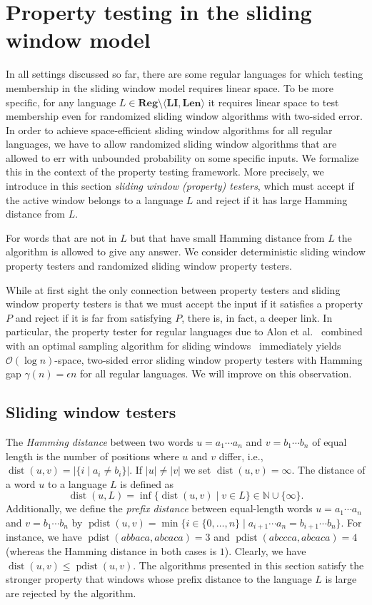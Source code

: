 \documentclass{theoretics}
\newcommand{\N}{\mathbb{N}}
\renewcommand{\O}{\mathcal{O}}
\DeclareMathOperator{\dist}{dist}
\DeclareMathOperator{\pdist}{pdist}
\newcommand{\Reg}{\mathbf{Reg}}
\newcommand{\Len}{\mathbf{Len}}
\newcommand{\LI}{\mathbf{LI}}
\renewcommand{\leq}{\leqslant}
\renewcommand{\le}{\leq}
\begin{document}
\section{Property testing in the sliding window model} \label{sec-SW-testing}

\label{chp:pt}
In all settings discussed so far, there are some regular languages for which testing membership in the sliding window model requires linear space.
To be more specific, for any language $L\in\Reg\setminus\langle \LI, \Len \rangle$ it requires linear space to test membership even for randomized sliding window algorithms with two-sided error.
In order to achieve space-efficient sliding window algorithms for all regular languages, we have
to allow randomized sliding window algorithms that are allowed to err with
unbounded probability on some specific inputs.
We formalize this in the context of the property testing framework. More precisely,
we introduce in this section {\em sliding window (property) testers},
which must accept if the active window belongs to a language $L$
and reject if it has large Hamming distance from $L$.

 For words that are not in $L$ but that have
small Hamming distance from $L$ the algorithm is allowed to give any answer.
We consider deterministic sliding window property testers
and randomized sliding window property testers.

While at first sight the only connection between property testers and sliding window property testers is that we must accept the input if it satisfies a property $P$ and reject if it is far from satisfying $P$, there is, in fact, a deeper link.
In particular, the property tester for regular languages due to Alon et al.~\cite{AlonKNS00}
combined with an optimal sampling algorithm for sliding windows~\cite{BravermanOZ12} immediately yields $\O(\log n)$-space, two-sided error sliding window property testers with Hamming gap $\gamma(n) = \epsilon n$ for all regular languages. We will improve on this observation. 

\subsection{Sliding window testers}

The {\em Hamming distance} between two words
$u = a_1 \cdots a_n$ and $v = b_1 \cdots b_n$ of equal length
is the number of positions where $u$ and $v$ differ, i.e.,~$\dist(u,v) = |\{ i \mid  a_i \neq b_i\}|$.
If $|u| \neq |v|$ we set $\dist(u,v) = \infty$.
The distance of a word $u$ to a language $L$ is defined as
\[
\dist(u,L) = \inf \{ \dist(u,v) \mid v \in L \} \in \N \cup \{\infty\}.
\]
Additionally, we define the \emph{prefix distance} between equal-length words
$u = a_1 \cdots a_n$ and $v = b_1 \cdots b_n$
by $\pdist(u,v) = \min \{ i \in \{0,\dots,n\} \mid a_{i+1} \cdots a_n = b_{i+1} \cdots b_n\}$.
For instance, we have $\pdist(abbaca, abcaca) = 3$ and $\pdist(abccca, abcaca) = 4$ (whereas the Hamming distance
in both cases is $1$).
Clearly, we have $\dist(u, v) \le \pdist(u,v)$.
The algorithms presented in this section satisfy the stronger property
that windows whose prefix distance to the language $L$ is large are rejected by the algorithm.
\end{document}
